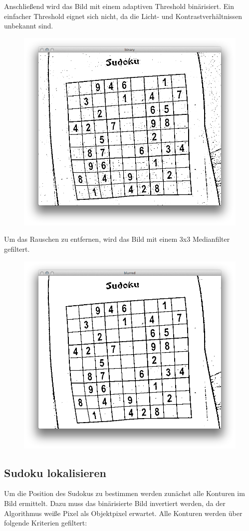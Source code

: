 Anschließend wird das Bild mit einem adaptiven Threshold binärisiert. Ein einfacher Threshold eignet sich nicht, da die Licht- und Kontrastverhältnissen unbekannt sind.

\begin{figure}[h!]
    \begin{center}
        \includegraphics[width=.5\textwidth]{Abbildungen/binary}
    \end{center}
\end{figure}

Um das Rauschen zu entfernen, wird das Bild mit einem 3x3 Medianfilter gefiltert.

\begin{figure}[h!]
    \begin{center}
        \includegraphics[width=.5\textwidth]{Abbildungen/median}
    \end{center}
\end{figure}


\subsection{Sudoku lokalisieren}
Um die Position des Sudokus zu bestimmen werden zunächst alle Konturen im Bild ermittelt. Dazu muss das binärisierte Bild invertiert werden, da der Algorithmus weiße Pixel als Objektpixel erwartet.
Alle Konturen werden über folgende Kriterien gefiltert:

